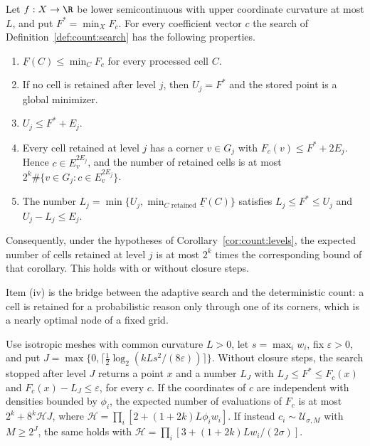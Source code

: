\begin{theorem}\label{thm:count:cells}
Let $f:X\to\R$ be lower semicontinuous with upper coordinate curvature at
most $L$, and put $F^*=\min_XF_c$. For every coefficient vector $c$ the
search of Definition~\ref{def:count:search} has the following properties.
\begin{enumerate}[label=(\roman*)]
\item $\underline F(C)\le\min_CF_c$ for every processed cell $C$.
\item If no cell is retained after level $j$, then $U_j=F^*$ and the stored
 point is a global minimizer.
\item $U_j\le F^*+E_j$.
\item Every cell retained at level $j$ has a corner $v\in G_j$ with
 $F_c(v)\le F^*+2E_j$. Hence $c\in E_v^{2E_j}$, and the number of retained
 cells is at most $2^k\#\{v\in G_j:c\in E_v^{2E_j}\}$.
\item The number $L_j=\min\{U_j,\min_{C\text{ retained}}\underline F(C)\}$
 satisfies $L_j\le F^*\le U_j$ and $U_j-L_j\le E_j$.
\end{enumerate}
Consequently, under the hypotheses of Corollary~\ref{cor:count:levels}, the
expected number of cells retained at level $j$ is at most $2^k$ times the
corresponding bound of that corollary. This holds with or without closure
steps.
\end{theorem}

Item (iv) is the bridge between the adaptive search and the deterministic
count: a cell is retained for a probabilistic reason only through one of its
corners, which is a nearly optimal node of a fixed grid.

\begin{corollary}\label{cor:count:approx}
Use isotropic meshes with common curvature $L>0$, let $s=\max_iw_i$, fix
$\varepsilon>0$, and put
$J=\max\{0,\lceil\frac12\log_2(kLs^2/(8\varepsilon))\rceil\}$. Without
closure steps, the search stopped after level $J$ returns a point $x$ and a
number $L_J$ with $L_J\le F^*\le F_c(x)$ and $F_c(x)-L_J\le\varepsilon$, for
every $c$. If the coordinates of $c$ are independent with densities bounded
by $\phi_i$, the expected number of evaluations of $F_c$ is at most
$2^k+8^k\mathcal HJ$, where $\mathcal H=\prod_i[2+(1+2k)L\phi_iw_i]$. If
instead $c_i\sim\mathcal U_{\sigma,M}$ with $M\ge2^J$, the same holds with
$\mathcal H=\prod_i[3+(1+2k)Lw_i/(2\sigma)]$.
\end{corollary}

